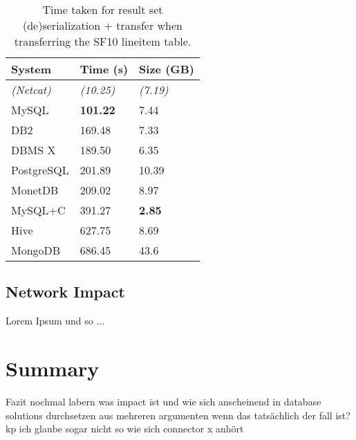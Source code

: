 \documentclass[sigconf]{acmart}
\begin{document}
\begin{table}[h!]
    \centering
    \caption{Time taken for result set (de)serialization + transfer when transferring the SF10 lineitem table.}
    \begin{tabular}{ p{2cm} | p{2cm}  p{2cm} }
        \textbf{System} & \textbf{Time (s)} & \textbf{Size (GB)} \\ \hline
        \textit{(Netcat)} & \textit{(10.25)} & \textit{(7.19)} \\ \hline
        MySQL & \textbf{101.22} & 7.44 \\ \hline
        DB2 & 169.48 & 7.33 \\ \hline
        DBMS X & 189.50 & 6.35 \\ \hline
        PostgreSQL & 201.89 & 10.39 \\ \hline
        MonetDB & 209.02 & 8.97 \\ \hline
        MySQL+C & 391.27 & \textbf{2.85} \\ \hline
        Hive & 627.75 & 8.69 \\ \hline
        MongoDB & 686.45 & 43.6
    \end{tabular}
\end{table}

\subsection{Network Impact}
Lorem Ipsum und so ...

\section{Summary}
Fazit nochmal labern was impact ist und wie sich anscheinend in database solutions durchsetzen aus mehreren argumenten wenn das tatsächlich der fall ist? kp
ich glaube sogar nicht so wie sich connector x anhört




\end{document}
